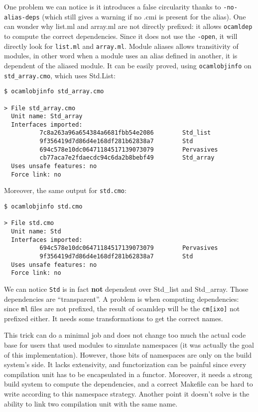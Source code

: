 \documentclass[11pt,a4paper]{article}
\begin{document}
One problem we can notice is it introduces a false circularity thanks to
\texttt{-no-alias-deps} (which still gives a warning if no .cmi is present for
the alias). One can wonder why list.ml and array.ml are not directly prefixed:
it allows \texttt{ocamldep} to compute the correct dependencies. Since it does
not use the \texttt{-open}, it will directly look for \texttt{list.ml} and
\texttt{array.ml}. Module aliases allows transitivity of modules, in other word
when a module uses an alias defined in another, it is dependent of the aliased
module. It can be easily proved, using \texttt{ocamlobjinfo} on
\texttt{std\_array.cmo}, which uses Std.List:

\begin{verbatim}
$ ocamlobjinfo std_array.cmo

> File std_array.cmo
  Unit name: Std_array
  Interfaces imported:
          7c8a263a96a654384a6681fbb54e2086        Std_list
          9f356419d7d86d4e168df281b62838a7        Std
          694c578e10dc06471184517139073079        Pervasives
          cb77aca7e2fdaecdc94c6da2b8bebf49        Std_array
  Uses unsafe features: no
  Force link: no
\end{verbatim}

Moreover, the same output for \texttt{std.cmo}:

\begin{verbatim}
$ ocamlobjinfo std.cmo

> File std.cmo
  Unit name: Std
  Interfaces imported:
          694c578e10dc06471184517139073079        Pervasives
          9f356419d7d86d4e168df281b62838a7        Std
  Uses unsafe features: no
  Force link: no
\end{verbatim}

We can notice \texttt{Std} is in fact \textbf{not} dependent over Std\_list and
Std\_array. Those dependencies are ``transparent''. A problem is when computing
dependencies: since \texttt{ml} files are not prefixed, the result of ocamldep will
be the \texttt{cm[ixo]} not prefixed either. It needs some transformations to get
the correct names.

This trick can do a minimal job and does not change too much the actual code
base for users that used modules to simulate namespaces (it was actually the
goal of this implementation). However, those bits of namespaces are only on the
build system's side. It lacks extensivity, and functorization can be painful
since every compilation unit has to be encapsulated in a functor. Moreover, it
needs a strong build system to compute the dependencies, and a correct Makefile
can be hard to write according to this namespace strategy. Another point it
doesn't solve is the ability to link two compilation unit with the same name.
\end{document}
